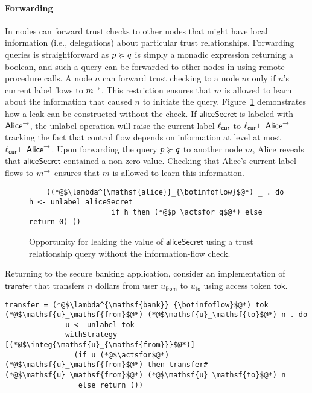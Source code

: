 \paragraph{Forwarding}
In \lang{} nodes can forward trust checks to other nodes that might have local information (i.e., delegations) about particular trust relationships. Forwarding queries is straightforward as $p \succcurlyeq q$ is simply a monadic expression returning a boolean, and such a query can be forwarded to other nodes in \lang{} using remote procedure calls.
A node $n$ can forward trust checking to a node $m$ only if $n$'s current label flows to $m^{\rightarrow}$. This restriction ensures that $m$ is allowed to learn about the information that caused $n$ to initiate the query. Figure~\ref{fig:leak-via-forward} demonstrates how a leak can be constructed without the check. If $\mathsf{aliceSecret}$ is labeled with $\mathsf{Alice}^{\rightarrow}$, the unlabel operation will raise the current label $\ell_{\mathsf{cur}}$ to $\ell_{\mathsf{cur}} \sqcup \mathsf{Alice}^{\rightarrow}$ tracking the fact that control flow depends on information at level at most $\ell_{\mathsf{cur}} \sqcup \mathsf{Alice}^{\rightarrow}$. Upon forwarding the query $p \succcurlyeq q$ to another node $m$, Alice reveals that $\mathsf{aliceSecret}$ contained a non-zero value. Checking that Alice's current label flows to $m^{\rightarrow}$ ensures that $m$ is allowed to learn this information.

\begin{figure}
    \centering
    \begin{lstlisting}
    ((*@$\lambda^{\mathsf{alice}}_{\botinfoflow}$@*) _ . do h <- unlabel aliceSecret
                   if h then (*@$p \actsfor q$@*) else return 0) ()
    \end{lstlisting}
    \caption{Opportunity for leaking the value of $\mathsf{aliceSecret}$ using a trust relationship query without the information-flow check.}
    \label{fig:leak-via-forward}
\end{figure}

Returning to the secure banking application, consider an implementation of $\mathsf{transfer}$ that transfers $n$ dollars from user $u_\mathsf{from}$ to $u_\mathsf{to}$ using access token $\mathsf{tok}$.

\begin{lstlisting}
transfer = (*@$\lambda^{\mathsf{bank}}_{\botinfoflow}$@*) tok (*@$\mathsf{u}_\mathsf{from}$@*) (*@$\mathsf{u}_\mathsf{to}$@*) n . do
              u <- unlabel tok
              withStrategy [(*@$\integ{\mathsf{u}_{\mathsf{from}}}$@*)]
                (if u (*@$\actsfor$@*) (*@$\mathsf{u}_\mathsf{from}$@*) then transfer# (*@$\mathsf{u}_\mathsf{from}$@*) (*@$\mathsf{u}_\mathsf{to}$@*) n
                 else return ())
\end{lstlisting}

